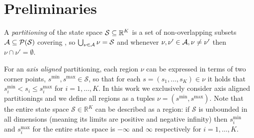 \section {Preliminaries}%
\label {sec:preliminaries}




\begin {definition}
  \label {def:partitioning}
  A \emph {partitioning} \Partition of the state space \( \mathcal S \subseteq \mathbb R ^K \) is a set of non-overlapping subsets \( \mathcal A \subseteq \mathcal P (\mathcal S) \) covering \SSpace, so \( \bigcup _{\nu \in \mathcal A} \nu = \mathcal S \) and whenever \( \nu, \nu' \in \mathcal A, \nu \neq \nu'  \) then \( \nu \cap \nu' = \emptyset \).
\end {definition}


For an \textit{axis aligned} partitioning, each region $\nu$ can be expressed in
terms of two corner points, $s^{\min}, s^{\max} \in \mathcal{S}$, so that for
each $s = (s_1, \ldots, s_K) \in \nu$ it holds that $s^{\min}_i < s_i \le
s^{\max}_i$ for $i = 1,\ldots,K$. In this work we exclusively consider axis
aligned partitionings and we define all regions as a tuples $\nu = (s^{\min},
s^{\max})$. Note that the entire state space $\mathcal{S} \in \mathbb{R}^K$ can
be described as a region: if $\mathcal{S}$ is unbounded in all dimensions
(meaning its limits are positive and negative infinity) then $s^{\min}_i$ and
$s^{\max}_i$ for the entire state space is $-\infty$ and $\infty$ respectively
for $i = 1,\ldots,K$.


